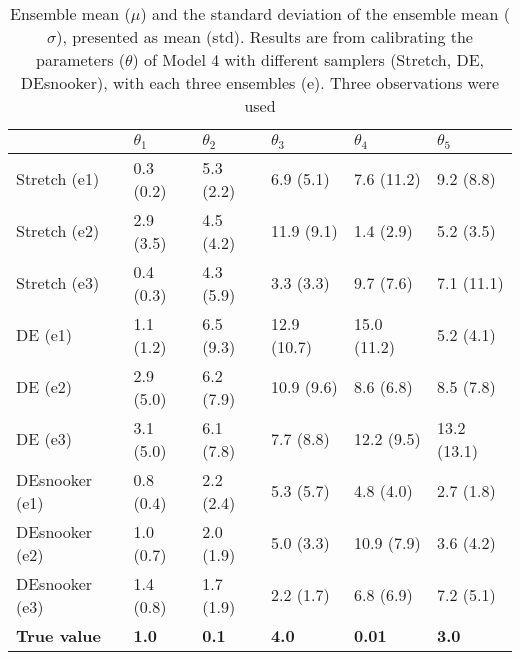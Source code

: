 \begin{table}[ht]
\caption{Ensemble mean ($\mu$) and the standard deviation of the ensemble mean ($\sigma$), presented as mean (std). Results are from calibrating the parameters ($\theta$) of Model 4 with different samplers (Stretch, DE, DEsnooker), with each three ensembles (e). Three observations were used}
\label{tab_logbook8_obs3_model4}
\begin{tabularx}{\textwidth}{lXXXXX}
\toprule
 & $\theta_1$ & $\theta_2$ & $\theta_3$ & $\theta_4$ & $\theta_5$ \\
\midrule
Stretch (e1) & 0.3 (0.2) & 5.3 (2.2) & 6.9 (5.1) & 7.6 (11.2) & 9.2 (8.8) \\
Stretch (e2) & 2.9 (3.5) & 4.5 (4.2) & 11.9 (9.1) & 1.4 (2.9) & 5.2 (3.5) \\
Stretch (e3) & 0.4 (0.3) & 4.3 (5.9) & 3.3 (3.3) & 9.7 (7.6) & 7.1 (11.1) \\
\midrule
DE (e1) & 1.1 (1.2) & 6.5 (9.3) & 12.9 (10.7) & 15.0 (11.2) & 5.2 (4.1) \\
DE (e2) & 2.9 (5.0) & 6.2 (7.9) & 10.9 (9.6) & 8.6 (6.8) & 8.5 (7.8) \\
DE (e3) & 3.1 (5.0) & 6.1 (7.8) & 7.7 (8.8) & 12.2 (9.5) & 13.2 (13.1) \\
\midrule
DEsnooker (e1) & 0.8 (0.4) & 2.2 (2.4) & 5.3 (5.7) & 4.8 (4.0) & 2.7 (1.8) \\
DEsnooker (e2) & 1.0 (0.7) & 2.0 (1.9) & 5.0 (3.3) & 10.9 (7.9) & 3.6 (4.2) \\
DEsnooker (e3) & 1.4 (0.8) & 1.7 (1.9) & 2.2 (1.7) & 6.8 (6.9) & 7.2 (5.1) \\
\midrule
\textbf{True value} & \textbf{1.0} & \textbf{0.1} &\textbf{4.0} & \textbf{0.01} &\textbf{3.0} \\
\bottomrule
\end{tabularx}
\end{table}


